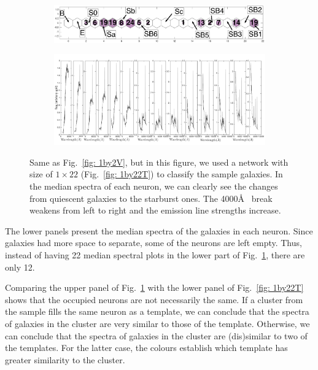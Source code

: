             \begin{figure}
                \begin{subfigure}[b]{\textwidth}
                    \includegraphics[width=\textwidth]{../image_paper2/1d/hit_v_1_by_22_n.png}
                    \centering
                \end{subfigure}
                \hfill
                \begin{subfigure}[b]{\textwidth}
                \centering
                     \includegraphics[width=\textwidth]{../image_paper2/1d/SED_total1by22.png}
                \end{subfigure}
                \caption[Classification of fitted galaxy SEDs from \citet{Hossein12} using the $1\times22$~networks]{Same as Fig.~\ref{fig: 1by2V}, but in this figure, we used a network with size of $1\times22$ (Fig.~\ref{fig: 1by22T}) to classify the sample galaxies. In the median spectra of each neuron, we can clearly see the changes from quiescent galaxies to the starburst ones. The 4000\AA~ break weakens from left to right and the emission line strengths increase.}
                \label{fig: 1by22V}
            \end{figure}

            The lower panels present the median spectra of the galaxies in each neuron.
            Since galaxies had more space to separate, some of the neurons are left empty.
            Thus, instead of having 22 median spectral plots in the lower part of Fig.~\ref{fig: 1by22V}, there are only 12.
            
            Comparing the upper panel of Fig.~\ref{fig: 1by22V} with the lower panel of Fig.~\ref{fig: 1by22T} shows that the occupied neurons are not necessarily the same.
            If a cluster from the  sample fills the same neuron as a  template, we can conclude that the spectra of galaxies in the cluster are very similar to those of the template.
            Otherwise, we can conclude that the spectra of galaxies in the cluster are (dis)similar to two of the  templates.
            For the latter case, the colours establish which template has greater similarity to the  cluster.
            
